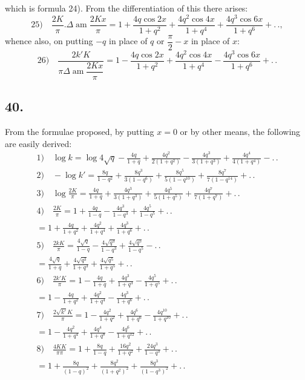 \documentclass{article}
\begin{document}
which is formula 24). From the differentiation of this there arises:
\[
\text{25)}\quad\frac{2K}{\pi}.\Delta\operatorname{am}\frac{2Kx}{\pi}=1+\frac{4q\cos2x}{1+q^{2}}+\frac{4q^{2}\cos4x}{1+q^{4}}+\frac{4q^{3}\cos6x}{1+q^{6}}+.\,.,
\]
whence also, on putting $-q$ in place of $q$ or $\dfrac{\pi}{2}-x$ in place of $x$:
\[
\text{26)}\quad\frac{2k'K}{\pi\Delta\operatorname{am}\dfrac{2Kx}{\pi}}=1-\frac{4q\cos2x}{1+q^{2}}+\frac{4q^{2}\cos4x}{1+q^{4}}-\frac{4q^{3}\cos6x}{1+q^{6}}+.\,.
\]

\subsection*{40.}

From the formulae proposed, by putting $x=0$ or by other means, the following are easily derived:
\[
\begin{gathered}
\text{1)}\quad\log k=\log4\sqrt{q}-\frac{4q}{1+q}+\frac{4q^{2}}{2(1+q^{2})}-\frac{4q^{3}}{3(1+q^{3})}+\frac{4q^{4}}{4(1+q^{4})}-.\,.\\[2ex]
\text{2)}\quad-\log k'=\frac{8q}{1-q^{2}}+\frac{8q^{3}}{3(1-q^{6})}+\frac{8q^{5}}{5(1-q^{10})}+\frac{8q^{7}}{7(1-q^{14})}+.\,.\\[2ex]
\text{3)}\quad\log\frac{2K}{\pi}=\frac{4q}{1+q}+\frac{4q^{3}}{3(1+q^{3})}+\frac{4q^{5}}{5(1+q^{5})}+\frac{4q^{7}}{7(1+q^{7})}+.\,.\\[2ex]
\text{4)}\quad\frac{2K}{\pi}=1+\frac{4q}{1-q}-\frac{4q^{3}}{1-q^{3}}+\frac{4q^{5}}{1-q^{5}}+.\,.\\[2ex]
=1+\frac{4q}{1+q^{2}}+\frac{4q^{2}}{1+q^{4}}+\frac{4q^{3}}{1+q^{6}}+.\,.\\[2ex]
\text{5)}\quad\frac{2kK}{\pi}=\frac{4\sqrt{q}}{1-q}-\frac{4\sqrt{q^{3}}}{1-q^{3}}+\frac{4\sqrt{q^{5}}}{1-q^{5}}-.\,.\\[2ex]
=\frac{4\sqrt{q}}{1+q}+\frac{4\sqrt{q^{3}}}{1+q^{3}}+\frac{4\sqrt{q^{5}}}{1+q^{5}}+.\,.\\[2ex]
\text{6)}\quad\frac{2k'K}{\pi}=1-\frac{4q}{1+q}+\frac{4q^{3}}{1+q^{3}}-\frac{4q^{5}}{1+q^{5}}+.\,.\\[2ex]
=1-\frac{4q}{1+q^{2}}+\frac{4q^{2}}{1+q^{4}}-\frac{4q^{3}}{1+q^{6}}+.\,.\\[2ex]
\text{7)}\quad\frac{2\sqrt{k'}K}{\pi}=1-\frac{4q^{2}}{1+q^{2}}+\frac{4q^{6}}{1+q^{6}}-\frac{4q^{10}}{1+q^{10}}+.\,.\\[2ex]
=1-\frac{4q^{2}}{1+q^{4}}+\frac{4q^{4}}{1+q^{8}}-\frac{4q^{6}}{1+q^{12}}+.\,.\\[2ex]
\text{8)}\quad\frac{4KK}{\pi\pi}=1+\frac{8q}{1-q}+\frac{16q^{2}}{1+q^{2}}+\frac{24q^{3}}{1-q^{3}}+.\,.\\[2ex]
=1+\frac{8q}{(1-q)^{2}}+\frac{8q^{2}}{(1+q^{2})^{2}}+\frac{8q^{3}}{(1-q^{3})^{2}}+.\,.
\end{gathered}
\]
\end{document}

